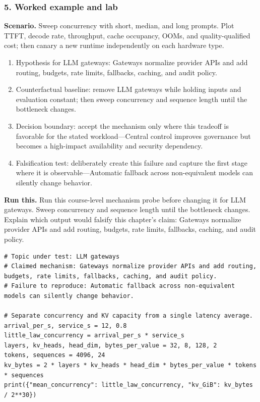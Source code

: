 \subsubsection*{5. Worked example and lab}
\textbf{Scenario.} Sweep concurrency with short, median, and long prompts. Plot TTFT, decode rate, throughput, cache occupancy, OOMs, and quality-qualified cost; then canary a new runtime independently on each hardware type.
\begin{enumerate}
\item Hypothesis for LLM gateways: Gateways normalize provider APIs and add routing, budgets, rate limits, fallbacks, caching, and audit policy.
\item Counterfactual baseline: remove LLM gateways while holding inputs and evaluation constant; then sweep concurrency and sequence length until the bottleneck changes.
\item Decision boundary: accept the mechanism only where this tradeoff is favorable for the stated workload—Central control improves governance but becomes a high-impact availability and security dependency.
\item Falsification test: deliberately create this failure and capture the first stage where it is observable—Automatic fallback across non-equivalent models can silently change behavior.
\end{enumerate}
\textbf{Run this.} Run this course-level mechanism probe before changing it for LLM gateways. Sweep concurrency and sequence length until the bottleneck changes. Explain which output would falsify this chapter's claim: Gateways normalize provider APIs and add routing, budgets, rate limits, fallbacks, caching, and audit policy.
\begin{Verbatim}[fontsize=\scriptsize]
# Topic under test: LLM gateways
# Claimed mechanism: Gateways normalize provider APIs and add routing, budgets, rate limits, fallbacks, caching, and audit policy.
# Failure to reproduce: Automatic fallback across non-equivalent models can silently change behavior.

# Separate concurrency and KV capacity from a single latency average.
arrival_per_s, service_s = 12, 0.8
little_law_concurrency = arrival_per_s * service_s
layers, kv_heads, head_dim, bytes_per_value = 32, 8, 128, 2
tokens, sequences = 4096, 24
kv_bytes = 2 * layers * kv_heads * head_dim * bytes_per_value * tokens * sequences
print({"mean_concurrency": little_law_concurrency, "kv_GiB": kv_bytes / 2**30})
\end{Verbatim}
